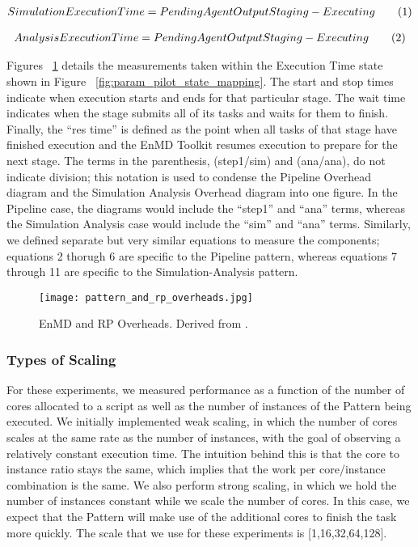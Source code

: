 \documentclass[]{article}
\newcommand\numberthis{\addtocounter{equation}{1}\tag{\theequation}}
\begin{document}
			\begin{align*}
				Simulation Execution Time = PendingAgentOutputStaging - Executing \numberthis \label{10}
			\end{align*}

			\begin{align*}
				Analysis Execution Time = PendingAgentOutputStaging - Executing \numberthis \label{11}
			\end{align*}



			Figures ~\ref{fig:pattern_rp_overheads} details the measurements taken within the Execution Time state shown in Figure ~\ref{fig:param_pilot_state_mapping}. The start and stop times indicate when execution starts and ends for that particular stage. The wait time indicates when the stage submits all of its tasks and waits for them to finish. Finally, the ``res time'' is defined as the point when all tasks of that stage have finished execution and the EnMD Toolkit resumes execution to prepare for the next stage. The terms in the parenthesis, (step1/sim) and (ana/ana), do not indicate division; this notation is used to condense the Pipeline Overhead diagram and the Simulation Analysis Overhead diagram into one figure. In the Pipeline case, the diagrams would include the ``step1'' and ``ana'' terms, whereas the Simulation Analysis case would include the ``sim'' and ``ana'' terms. Similarly, we defined separate but very similar equations to measure the components; equations 2 thorugh 6 are specific to the Pipeline pattern, whereas equations 7 through 11 are specific to the Simulation-Analysis pattern.

			\begin{figure}[H]
				\centering
				\texttt{[image: pattern\_and\_rp\_overheads.jpg]}
				\caption{EnMD and RP Overheads. Derived from \cite{rp_state_diagram}.}
				\label{fig:pattern_rp_overheads}
			\end{figure}

		\subsubsection{Types of Scaling}
			For these experiments, we measured performance as a function of the number of cores allocated to a script as well as the number of instances of the Pattern being executed. We initially implemented weak scaling, in which the number of cores scales at the same rate as the number of instances, with the goal of observing a relatively constant execution time. The intuition behind this is that the core to instance ratio stays the same, which implies that the work per core/instance combination is the same. We also perform strong scaling, in which we hold the number of instances constant while we scale the number of cores. In this case, we expect that the Pattern will make use of the additional cores to finish the task more quickly. The scale that we use for these experiments is [1,16,32,64,128].
\end{document}
